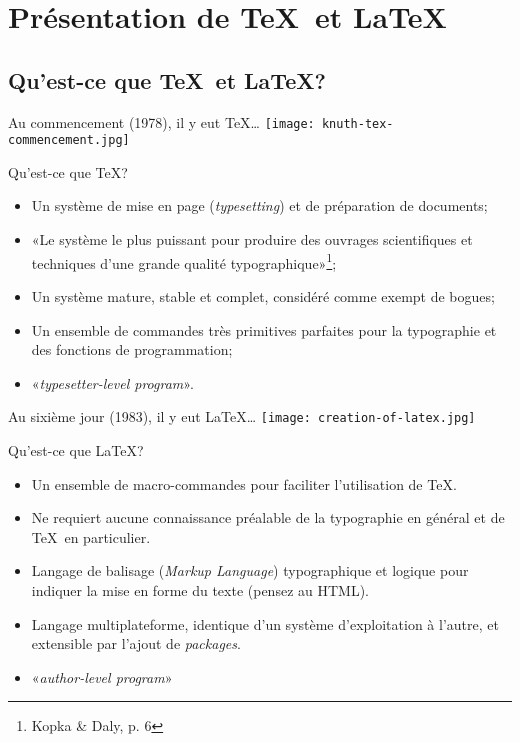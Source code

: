 \small

\section{Présentation de \TeX\ et \LaTeX}

\subsection{Qu'est-ce que \TeX\ et \LaTeX?}

\begin{frame}[c,label=fr:commencement]{Au commencement (1978), il y eut \TeX\ldots}
	\texttt{[image: knuth-tex-commencement.jpg]}
\end{frame}

\begin{frame}[c]{Qu'est-ce que \TeX?}

	\begin{itemize}
		\item Un système de mise en page (\emph{typesetting}) et de préparation de documents;
		\item «Le système le plus puissant pour produire des ouvrages scientifiques et
		techniques d'une grande qualité typographique»\footnote{Kopka \& Daly, p. 6};
		\item Un système mature, stable et complet, considéré comme exempt de bogues;
		\item Un ensemble de commandes très primitives parfaites pour la typographie et
		des fonctions de programmation;
		\item «\emph{typesetter-level program}».
	\end{itemize}

\end{frame}

\begin{frame}[c,label=fr:sixiemejour]{Au sixième jour (1983), il y eut \LaTeX\ldots}
	\texttt{[image: creation-of-latex.jpg]}
\end{frame}

\begin{frame}{Qu'est-ce que \LaTeX?}
	\begin{itemize}
		\item Un ensemble de macro-commandes pour faciliter l'utilisation de \TeX.
		\item Ne requiert aucune connaissance préalable de la typographie en général et de \TeX\ en particulier.
		\item Langage de balisage (\emph{Markup Language}) typographique et logique pour indiquer la mise en forme du texte (pensez au HTML).
		\item Langage multiplateforme, identique d'un système d'exploitation à l'autre, et extensible par l'ajout de \emph{packages}.
		\item «\emph{author-level program}»
	\end{itemize}
\end{frame}

